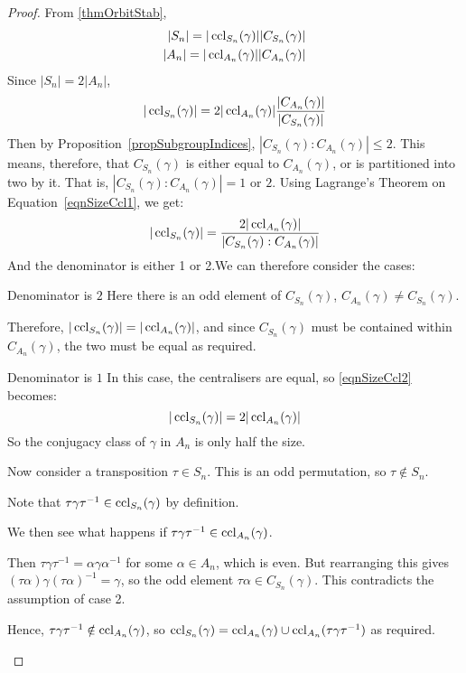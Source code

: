 \documentclass[../Main.tex]{subfiles}
\begin{document}
\begin{proof}
    From \ref{thmOrbitStab}, 
    \begin{align*}
        |S_n| = |\operatorname{ccl}_{S_n}(\gamma)||C_{S_n}(\gamma)| \\
        |A_n| = |\operatorname{ccl}_{A_n}(\gamma)||C_{A_n}(\gamma)| \\
    \end{align*}
    Since $|S_n| = 2|A_n|$,
    \begin{equation}
        |\operatorname{ccl}_{S_n}(\gamma)| = 2|\operatorname{ccl}_{A_n}(\gamma)|\frac{|C_{A_n}(\gamma)|}{|C_{S_n}(\gamma)|}
        \label{eqnSizeCcl1}
    \end{equation}
    Then by Proposition~\ref{propSubgroupIndices}, $|C_{S_n}(\gamma) : C_{A_n}(\gamma)| \leq 2$. This means, therefore, that $C_{S_n}(\gamma)$ is either equal to $C_{A_n}(\gamma)$, or is partitioned into two by it. That is, $|C_{S_n}(\gamma) : C_{A_n}(\gamma)| = 1$ or $2$. Using Lagrange's Theorem on Equation~\ref{eqnSizeCcl1}, we get:
    \begin{equation}
        |\operatorname{ccl}_{S_n}(\gamma)| = \frac{2|\operatorname{ccl}_{A_n}(\gamma)|}{|C_{S_n}(\gamma) : C_{A_n}(\gamma)|}
        \label{eqnSizeCcl2}
    \end{equation}
    And the denominator is either 1 or 2.We can therefore consider the cases:\par
    \begin{case}{Denominator is $2$}
        Here there is an odd element of $C_{S_n}(\gamma)$, $C_{A_n}(\gamma) \neq C_{S_n}(\gamma)$.\par
        Therefore, $|\operatorname{ccl}_{S_n}(\gamma)| = |\operatorname{ccl}_{A_n}(\gamma)|$, and since $C_{S_n}(\gamma)$ must be contained within $C_{A_n}(\gamma)$, the two must be equal as required.\par
    \end{case}
    \begin{case}{Denominator is $1$}
        In this case, the centralisers are equal, so \ref{eqnSizeCcl2} becomes:
        \begin{equation*}
            |\operatorname{ccl}_{S_n}(\gamma)| = 2|\operatorname{ccl}_{A_n}(\gamma)|
        \end{equation*}
        So the conjugacy class of $\gamma$ in $A_n$ is only half the size.\par
        Now consider a transposition $\tau \in S_n$. This is an odd permutation, so $\tau \notin S_n$.\par
        Note that $\tau\gamma\tau^{-1} \in \operatorname{ccl}_{S_n}(\gamma)$ by definition.\par
        We then see what happens if $\tau\gamma\tau^{-1} \in \operatorname{ccl}_{A_n}(\gamma)$.\par
        Then $\tau\gamma\tau^{-1} = \alpha\gamma\alpha^{-1}$ for some $\alpha \in A_n$, which is even. But rearranging this gives $(\tau\alpha)\gamma(\tau\alpha)^{-1} = \gamma$, so the odd element $\tau\alpha \in C_{S_n}(\gamma)$. This contradicts the assumption of case 2.\par
        Hence, $\tau\gamma\tau^{-1} \notin \operatorname{ccl}_{A_n}(\gamma)$, so $\operatorname{ccl}_{S_n}(\gamma) = \operatorname{ccl}_{A_n}(\gamma) \cup \operatorname{ccl}_{A_n}(\tau\gamma\tau^{-1})$ as required.
    \end{case}
\end{proof}
\end{document}
